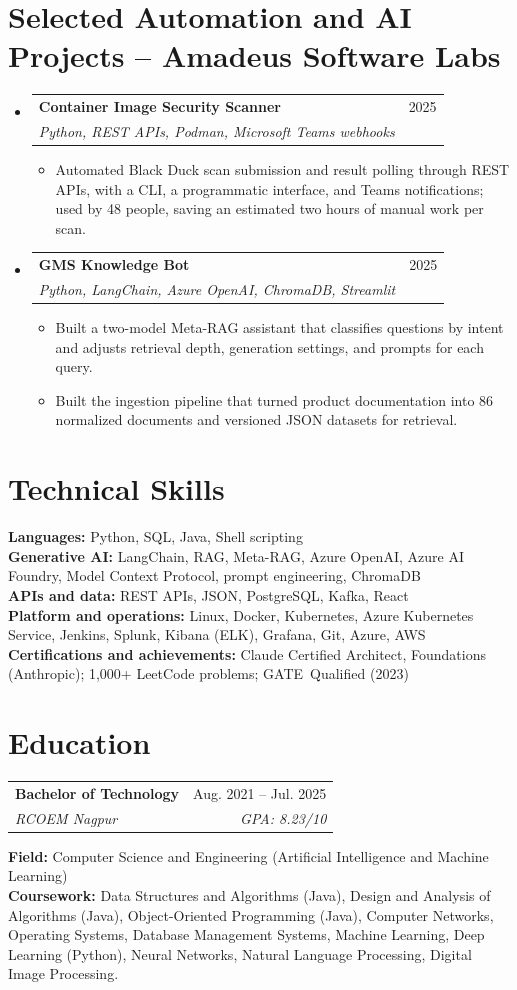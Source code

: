 \documentclass[a4paper,11pt]{article}
\makeatletter
\newcommand{\entry}[4]{\item\begin{tabularx}{\textwidth}{@{}Xr@{}}\textbf{#1}& #2\\\textit{\small #3}&\textit{\small #4}\end{tabularx}\vspace{-5pt}}
\newcommand{\bulletpoint}[1]{\item\small{#1}}
\makeatother
\begin{document}
\section{Selected Automation and AI Projects -- Amadeus Software Labs}
\begin{itemize}[leftmargin=0in,label={}]
  \entry{Container Image Security Scanner}{2025}{Python, REST APIs, Podman, Microsoft Teams webhooks}{}
  \begin{itemize}
    \bulletpoint{Automated Black Duck scan submission and result polling through REST APIs, with a CLI, a programmatic interface, and Teams notif{}ications; used by 48 people, saving an estimated two hours of manual work per scan.}
  \end{itemize}
  \entry{GMS Knowledge Bot}{2025}{Python, LangChain, Azure OpenAI, ChromaDB, Streamlit}{}
  \begin{itemize}
    \bulletpoint{Built a two-model Meta-RAG assistant that classif{}ies questions by intent and adjusts retrieval depth, generation settings, and prompts for each query.}
    \bulletpoint{Built the ingestion pipeline that turned product documentation into 86 normalized documents and versioned JSON datasets for retrieval.}
  \end{itemize}
\end{itemize}

\section{Technical Skills}
\small\textbf{Languages:} Python, SQL, Java, Shell scripting \\
\textbf{Generative AI:} LangChain, RAG, Meta-RAG, Azure OpenAI, Azure AI Foundry, Model Context Protocol, prompt engineering, ChromaDB \\
\textbf{APIs and data:} REST APIs, JSON, PostgreSQL, Kafka, React \\
\textbf{Platform and operations:} Linux, Docker, Kubernetes, Azure Kubernetes Service, Jenkins, Splunk, Kibana (ELK), Grafana, Git, Azure, AWS \\
\textbf{Certif{}ications and achievements:} Claude \mbox{Certif{}ied} Architect, Foundations (Anthropic); 1,000+ LeetCode problems; \mbox{GATE Qualif{}ied} (2023)

\section{Education}
\begin{tabularx}{\textwidth}{@{}Xr@{}}
  \textbf{Bachelor of Technology} & Aug. 2021 -- Jul. 2025 \\
  \textit{\small RCOEM Nagpur} & \textit{\small GPA: 8.23/10} \\
\end{tabularx}
\small\textbf{Field:} Computer Science and Engineering (Artif{}icial Intelligence and Machine Learning)\\
\small\textbf{Coursework:} Data Structures and Algorithms (Java), Design and Analysis of Algorithms (Java), Object-Oriented Programming (Java), Computer Networks, Operating Systems, Database Management Systems, Machine Learning, Deep Learning (Python), Neural Networks, Natural Language Processing, Digital Image Processing.
\end{document}
